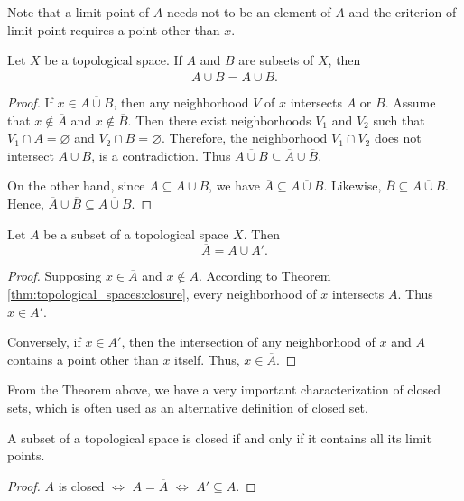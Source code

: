 Note that a limit point of $A$ needs not to be an element of $A$ and the 
criterion of limit point requires a point other than $x$. 

\begin{prop}
Let $X$ be a topological space. If $A$ and $B$ are subsets of $X$, then 
\begin{equation*}
    \overline{A \cup B} = \overline{A} \cup \overline{B}. 
\end{equation*}
\end{prop}
\begin{proof}
If $x \in \overline{A \cup B}$, then any neighborhood $V$ of $x$ intersects 
$A$ or $B$. 
Assume that $x \notin \overline{A}$ and $x \notin \overline{B}$. 
Then there exist neighborhoods $V_1$ and $V_2$ such that $V_1 \cap A = 
\varnothing$  and $V_2 \cap B = \varnothing$. 
Therefore, the neighborhood $V_1 \cap V_2$ does not intersect $A \cup B$, 
is a contradiction. 
Thus $\overline{A \cup B} \subseteq \overline{A} \cup \overline{B}$. 

On the other hand, since $A \subseteq A \cup B$, we have $\overline{A} \subseteq 
\overline{A \cup B}$. 
Likewise, $\overline{B} \subseteq \overline{A \cup B}$. 
Hence, $\overline{A} \cup \overline{B} \subseteq \overline{A \cup B}$. 
\end{proof}

\begin{thm}
Let $A$ be a subset of a topological space $X$. Then 
\begin{equation*}
    \overline{A} = A \cup A'. 
\end{equation*}
\begin{proof}
Supposing $x \in \overline{A}$ and $x \notin A$. 
According to Theorem \ref{thm:topological_spaces:closure}, every 
neighborhood of $x$ intersects $A$. 
Thus $x \in A'$. 

Conversely, if $x \in A'$, then the intersection of any neighborhood of $x$ 
and $A$ contains a point other than $x$ itself. 
Thus, $x \in \overline{A}$. 
\end{proof}
\end{thm}

From the Theorem above, we have a very important characterization of closed 
sets, which is often used as an alternative definition of closed set. 
\begin{cor}
A subset of a topological space is closed if and only if it contains all its 
limit points. 
\end{cor}
\begin{proof}
$A$ is closed $\Leftrightarrow$ $A = \overline{A}$ 
$\Leftrightarrow$ $A' \subseteq A$. 
\end{proof}

